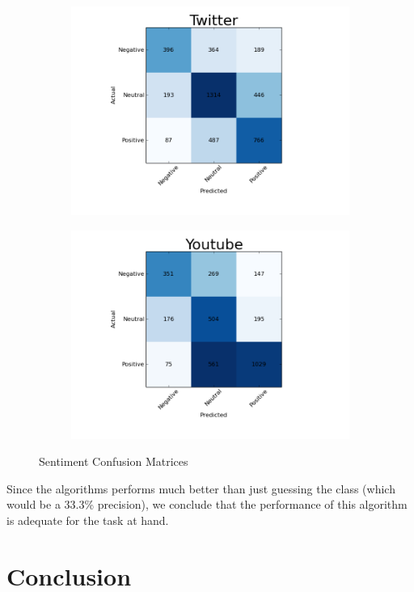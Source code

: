 \begin{figure}[t!]
    \centering
    \begin{subfigure}[b]{0.4\textwidth}
            \centering
            \includegraphics[width=\textwidth]{fig/Twitter.png}
            \caption{}
            \label{fig:twitter}
    \end{subfigure}
    \begin{subfigure}[b]{0.4\textwidth}
            \centering
            \includegraphics[width=\textwidth]{fig/Youtube.png}
            \caption{}
            \label{fig:youtube}
    \end{subfigure}
    \caption{Sentiment Confusion Matrices}
    \label{fig:confmat}
\end{figure}

Since the algorithms performs much better than just guessing the class (which would be a 33.3\% precision), we conclude that the performance of this algorithm is adequate for the task at hand.

\section{Conclusion}
\pagebreak




